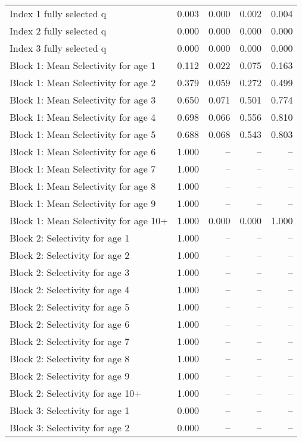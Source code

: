 \documentclass[
]{article}
\begin{document}
\begin{landscape}
\begin{longtable}[t]{lrrrr}
\endfoot
\bottomrule
\endlastfoot
Index 1 fully selected q & 0.003 & 0.000 & 0.002 & 0.004\\
Index 2 fully selected q & 0.000 & 0.000 & 0.000 & 0.000\\
Index 3 fully selected q & 0.000 & 0.000 & 0.000 & 0.000\\
Block 1: Mean Selectivity for age 1 & 0.112 & 0.022 & 0.075 & 0.163\\
Block 1: Mean Selectivity for age 2 & 0.379 & 0.059 & 0.272 & 0.499\\
\addlinespace
Block 1: Mean Selectivity for age 3 & 0.650 & 0.071 & 0.501 & 0.774\\
Block 1: Mean Selectivity for age 4 & 0.698 & 0.066 & 0.556 & 0.810\\
Block 1: Mean Selectivity for age 5 & 0.688 & 0.068 & 0.543 & 0.803\\
Block 1: Mean Selectivity for age 6 & 1.000 & -- & -- & --\\
Block 1: Mean Selectivity for age 7 & 1.000 & -- & -- & --\\
\addlinespace
Block 1: Mean Selectivity for age 8 & 1.000 & -- & -- & --\\
Block 1: Mean Selectivity for age 9 & 1.000 & -- & -- & --\\
Block 1: Mean Selectivity for age 10+ & 1.000 & 0.000 & 0.000 & 1.000\\
Block 2: Selectivity for age 1 & 1.000 & -- & -- & --\\
Block 2: Selectivity for age 2 & 1.000 & -- & -- & --\\
\addlinespace
Block 2: Selectivity for age 3 & 1.000 & -- & -- & --\\
Block 2: Selectivity for age 4 & 1.000 & -- & -- & --\\
Block 2: Selectivity for age 5 & 1.000 & -- & -- & --\\
Block 2: Selectivity for age 6 & 1.000 & -- & -- & --\\
Block 2: Selectivity for age 7 & 1.000 & -- & -- & --\\
\addlinespace
Block 2: Selectivity for age 8 & 1.000 & -- & -- & --\\
Block 2: Selectivity for age 9 & 1.000 & -- & -- & --\\
Block 2: Selectivity for age 10+ & 1.000 & -- & -- & --\\
Block 3: Selectivity for age 1 & 0.000 & -- & -- & --\\
Block 3: Selectivity for age 2 & 0.000 & -- & -- & --\\

\end{longtable}
\end{landscape}
\end{document}
